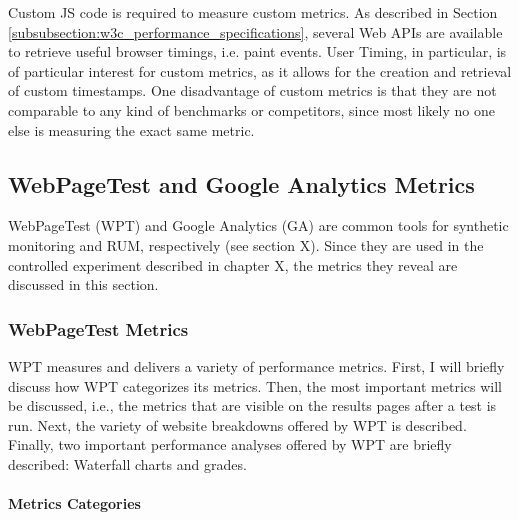 

Custom JS code is required to measure custom metrics.
As described in Section \ref{subsubsection:w3c_performance_specifications}, several Web APIs are available to retrieve useful browser timings, i.e. paint events.
User Timing, in particular, is of particular interest for custom metrics, as it allows for the creation and retrieval of custom timestamps.
One disadvantage of custom metrics is that they are not comparable to any kind of benchmarks or competitors, since most likely no one else is measuring the exact same metric.



\subsection{WebPageTest and Google Analytics Metrics} %
\label{subsection:wpt_ga_metrics}

WebPageTest (WPT) and Google Analytics (GA) are common tools for synthetic monitoring and RUM, respectively (see section X).
Since they are used in the controlled experiment described in chapter X, the metrics they reveal are discussed in this section.



\subsubsection{WebPageTest Metrics} %
\label{subsubsection:wpt_metrics}

WPT measures and delivers a variety of performance metrics.
First, I will briefly discuss how WPT categorizes its metrics.
Then, the most important metrics will be discussed, i.e., the metrics that are visible on the results pages after a test is run.
Next, the variety of website breakdowns offered by WPT is described.
Finally, two important performance analyses offered by WPT are briefly described: Waterfall charts and grades.


\paragraph{Metrics Categories} %

